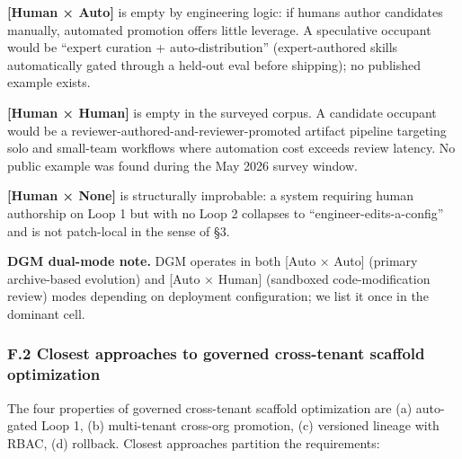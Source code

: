\documentclass[
]{article}
\begin{document}
\textbf{{[}Human × Auto{]}} is empty by engineering logic: if humans
author candidates manually, automated promotion offers little leverage.
A speculative occupant would be ``expert curation + auto-distribution''
(expert-authored skills automatically gated through a held-out eval
before shipping); no published example exists.

\textbf{{[}Human × Human{]}} is empty in the surveyed corpus. A
candidate occupant would be a reviewer-authored-and-reviewer-promoted
artifact pipeline targeting solo and small-team workflows where
automation cost exceeds review latency. No public example was found
during the May 2026 survey window.

\textbf{{[}Human × None{]}} is structurally improbable: a system
requiring human authorship on Loop 1 but with no Loop 2 collapses to
``engineer-edits-a-config'' and is not patch-local in the sense of §3.

\textbf{DGM dual-mode note.} DGM operates in both {[}Auto × Auto{]}
(primary archive-based evolution) and {[}Auto × Human{]} (sandboxed
code-modification review) modes depending on deployment configuration;
we list it once in the dominant cell.

\subsubsection{F.2 Closest approaches to governed cross-tenant scaffold
optimization}\label{f.2-closest-approaches-to-governed-cross-tenant-scaffold-optimization}

The four properties of governed cross-tenant scaffold optimization are
(a) auto-gated Loop 1, (b) multi-tenant cross-org promotion, (c)
versioned lineage with RBAC, (d) rollback. Closest approaches partition
the requirements:
\end{document}
